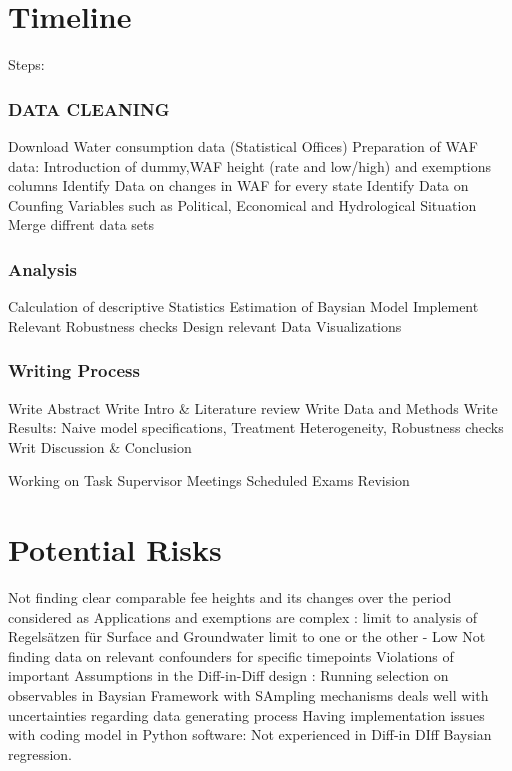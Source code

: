 \documentclass[11pt]{article}
\begin{document}
\newpage
\section{Timeline}
\label{sec:orge531a8a}

Steps:
\subsubsection{DATA CLEANING}
\label{sec:org0358de1}
Download Water consumption data (Statistical Offices)
Preparation of WAF data: Introduction of dummy,WAF height (rate and low/high) and exemptions columns
Identify Data on changes in WAF for every state
Identify Data on Counfing Variables such as Political, Economical and Hydrological Situation
Merge diffrent data sets
\subsubsection{Analysis}
\label{sec:orgf6b0770}
Calculation of descriptive Statistics
Estimation of Baysian Model
Implement Relevant Robustness checks
Design relevant Data Visualizations 
\subsubsection{Writing Process}
\label{sec:org737df6f}
Write Abstract
Write Intro \& Literature review
Write Data and Methods
Write Results: Naive model specifications, Treatment Heterogeneity, Robustness checks
Writ Discussion \& Conclusion

Working on Task
Supervisor Meetings
Scheduled Exams
Revision

\newpage
\section{Potential Risks}
\label{sec:org6049452}
Not finding clear comparable fee heights and its changes over the period considered as Applications and exemptions are complex  : limit to analysis of Regelsätzen für Surface and Groundwater limit to one or the other - Low
Not finding data on relevant confounders for specific timepoints
Violations of important Assumptions in the Diff-in-Diff design : Running selection on observables in Baysian Framework with SAmpling mechanisms deals well with uncertainties regarding data generating process
Having implementation issues with coding model in Python software: Not  experienced in Diff-in DIff Baysian regression.
\end{document}
